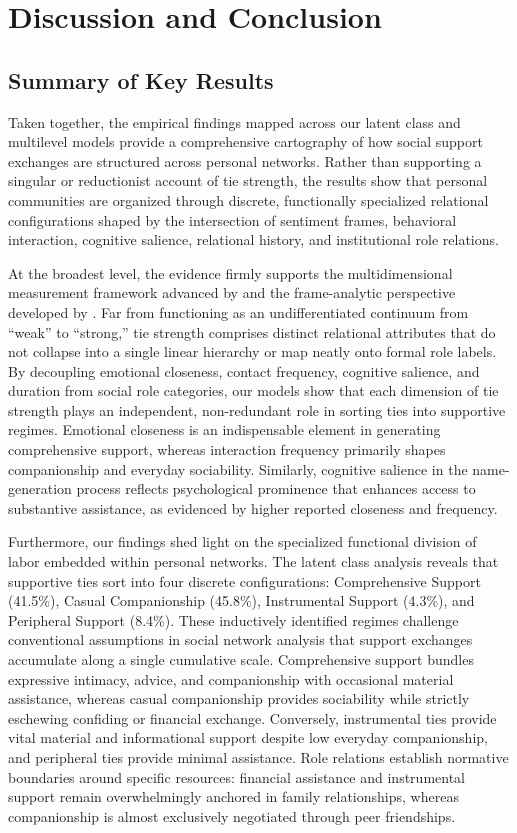 \documentclass[12pt]{article}
\begin{document}
\section{Discussion and Conclusion}

\subsection{Summary of Key Results}

Taken together, the empirical findings mapped across our latent class and multilevel models provide a comprehensive cartography of how social support exchanges are structured across personal networks. Rather than supporting a singular or reductionist account of tie strength, the results show that personal communities are organized through discrete, functionally specialized relational configurations shaped by the intersection of sentiment frames, behavioral interaction, cognitive salience, relational history, and institutional role relations.

At the broadest level, the evidence firmly supports the multidimensional measurement framework advanced by \citet{marsden1984measuring} and the frame-analytic perspective developed by \citet{lizardo2024theorizing}. Far from functioning as an undifferentiated continuum from ``weak'' to ``strong,'' tie strength comprises distinct relational attributes that do not collapse into a single linear hierarchy or map neatly onto formal role labels. By decoupling emotional closeness, contact frequency, cognitive salience, and duration from social role categories, our models show that each dimension of tie strength plays an independent, non-redundant role in sorting ties into supportive regimes. Emotional closeness is an indispensable element in generating comprehensive support, whereas interaction frequency primarily shapes companionship and everyday sociability. Similarly, cognitive salience in the name-generation process reflects psychological prominence that enhances access to substantive assistance, as evidenced by higher reported closeness and frequency.

Furthermore, our findings shed light on the specialized functional division of labor embedded within personal networks. The latent class analysis reveals that supportive ties sort into four discrete configurations: Comprehensive Support (41.5\%), Casual Companionship (45.8\%), Instrumental Support (4.3\%), and Peripheral Support (8.4\%). These inductively identified regimes challenge conventional assumptions in social network analysis that support exchanges accumulate along a single cumulative scale. Comprehensive support bundles expressive intimacy, advice, and companionship with occasional material assistance, whereas casual companionship provides sociability while strictly eschewing confiding or financial exchange. Conversely, instrumental ties provide vital material and informational support despite low everyday companionship, and peripheral ties provide minimal assistance. Role relations establish normative boundaries around specific resources: financial assistance and instrumental support remain overwhelmingly anchored in family relationships, whereas companionship is almost exclusively negotiated through peer friendships.
\end{document}
